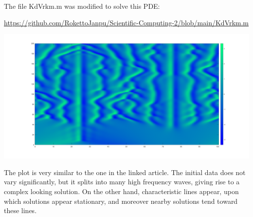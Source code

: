 \documentclass{article}
\begin{document}
The file KdVrkm.m was modified to solve this PDE:

\url{https://github.com/RokettoJanpu/Scientific-Computing-2/blob/main/KdVrkm.m}
\begin{center}
	\includegraphics[scale=.3]{hw13 q4 plot}
\end{center}
The plot is very similar to the one in the linked article. The initial data does not vary significantly, but it splits into many high frequency waves, giving rise to a complex looking solution. On the other hand, characteristic lines appear, upon which solutions appear stationary, and moreover nearby solutions tend toward these lines. 
	
\end{document}
